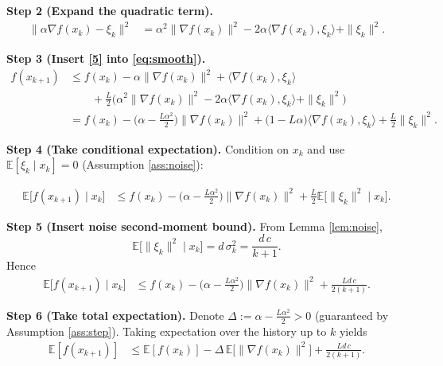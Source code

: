 \documentclass{article}
\newcommand{\E}{\mathbb{E}}
\begin{document}
\noindent\textbf{Step 2 (Expand the quadratic term).}
\begin{align}
\big\|\alpha\nabla f(x_{k})-\xi_{k}\big\|^{2}
&= \alpha^{2}\|\nabla f(x_{k})\|^{2}
   -2\alpha\langle\nabla f(x_{k}),\xi_{k}\rangle
   +\|\xi_{k}\|^{2}.
\tag{5}
\end{align}

\noindent\textbf{Step 3 (Insert \eqref{5} into \eqref{eq:smooth}).}
\begin{align}
f(x_{k+1})
&\le f(x_{k})
   -\alpha\|\nabla f(x_{k})\|^{2}
   +\langle\nabla f(x_{k}),\xi_{k}\rangle \nonumber\\
&\qquad +\frac{L}{2}
   \big(\alpha^{2}\|\nabla f(x_{k})\|^{2}
        -2\alpha\langle\nabla f(x_{k}),\xi_{k}\rangle
        +\|\xi_{k}\|^{2}\big) \nonumber\\
&= f(x_{k})
   -\Big(\alpha-\frac{L\alpha^{2}}{2}\Big)\|\nabla f(x_{k})\|^{2}
   +\Big(1-\!L\alpha\Big)\langle\nabla f(x_{k}),\xi_{k}\rangle
   +\frac{L}{2}\|\xi_{k}\|^{2}.
\tag{6}
\end{align}

\noindent\textbf{Step 4 (Take conditional expectation).}  
Condition on $x_{k}$ and use $\E[\xi_{k}\mid x_{k}]=0$ (Assumption \ref{ass:noise}):

\begin{align}
\E\!\big[f(x_{k+1})\mid x_{k}\big]
&\le f(x_{k})
   -\Big(\alpha-\frac{L\alpha^{2}}{2}\Big)\|\nabla f(x_{k})\|^{2}
   +\frac{L}{2}\E\!\big[\|\xi_{k}\|^{2}\mid x_{k}\big] .
\tag{7}
\end{align}

\noindent\textbf{Step 5 (Insert noise second‑moment bound).}  
From Lemma \ref{lem:noise},
\[
\E\!\big[\|\xi_{k}\|^{2}\mid x_{k}\big]=d\,\sigma_{k}^{2}= \frac{d\,c}{k+1}.
\]
Hence
\begin{align}
\E\!\big[f(x_{k+1})\mid x_{k}\big]
&\le f(x_{k})
   -\Big(\alpha-\frac{L\alpha^{2}}{2}\Big)\|\nabla f(x_{k})\|^{2}
   +\frac{L d\,c}{2(k+1)} .
\tag{8}
\end{align}

\noindent\textbf{Step 6 (Take total expectation).}
Denote $\Delta\!:=\alpha-\frac{L\alpha^{2}}{2}>0$ (guaranteed by Assumption \ref{ass:step}). Taking expectation over the history up to $k$ yields
\begin{align}
\E[f(x_{k+1})]
&\le \E[f(x_{k})] - \Delta\,\E\!\big[\|\nabla f(x_{k})\|^{2}\big]
   +\frac{L d\,c}{2(k+1)} .
\tag{9}
\end{align}
\end{document}

